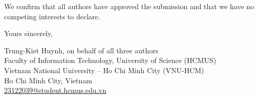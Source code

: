 \documentclass[11pt,a4paper]{article}
\begin{document}
We confirm that all authors have approved the submission and that we have no
competing interests to declare.

\bigskip

\noindent
Yours sincerely,

\bigskip

\noindent
Trung-Kiet Huynh, on behalf of all three authors\\
Faculty of Information Technology, University of Science (HCMUS)\\
Vietnam National University -- Ho Chi Minh City (VNU-HCM)\\
Ho Chi Minh City, Vietnam\\
\href{mailto:23122039@student.hcmus.edu.vn}{23122039@student.hcmus.edu.vn}
\end{document}
